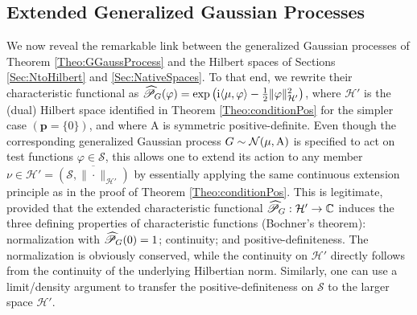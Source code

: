 \documentclass[11pt, english,english]{article}
\newcommand{\C}{ \mathbb{C}}
\newcommand{\R}{ \mathbb{R}}
\def\V#1{{\boldsymbol{#1}}}         %
\def\Spc#1{{\mathcal{#1}}}  %
\def\Op#1{{\mathrm{#1}}}  %
\def\jj{\mathrm{i}}
\def\Prob{\mathscr{P}}
\def\Form{\widehat{\Prob}}
\def\Identity{\mathrm{Id}} %
\renewcommand{\[}{\begin{equation}}
\renewcommand{\]}[1]{\label{eq:#1}\end{equation}}
\def\Prob{\mathscr{P}}
\def\Form{\widehat{\Prob}}
\def\gRand#1{{\uppercase{ #1}}}         %
\begin{document}
\subsection{Extended Generalized Gaussian Processes}
\label{Sec:ExtendedProcesses}
We now reveal the remarkable link between the generalized Gaussian processes of Theorem \ref{Theo:GGaussProcess} and the Hilbert spaces of Sections \ref{Sec:NtoHilbert} and \ref{Sec:NativeSpaces}.
To that end, we rewrite their characteristic functional as
$\Form_{\gRand g}(\varphi)= \exp\left( \jj \langle \mu,\varphi\rangle - \frac{1}{2} \|\varphi\|^2_{\Spc H'} \right)$, where
$\Spc H'$ is the (dual) Hilbert space identified in Theorem \ref{Theo:conditionPos} for the simpler case $(\V p=\{0\})$, and where $\Op A$ is symmetric positive-definite.
Even though the corresponding generalized Gaussian process $\gRand g \sim \Spc N(\mu,\Op A)$ is specified to act on test functions $\varphi \in \Spc S$, this allows one to extend its action to any member $\nu \in \Spc H'=\overline{(\Spc S,\|\cdot\|_{\Spc H'})}$ by essentially applying the same continuous extension principle as in the proof of Theorem \ref{Theo:conditionPos}.
This is legitimate, provided that the extended characteristic functional $\Form_{\gRand g}: \Spc H' \to \C$ induces the three defining properties of characteristic functions (Bochner's theorem): normalization with $\Form_{\gRand g}(0)=1$; continuity; and positive-definiteness.
The normalization is obviously conserved, while the continuity on $\Spc H'$ directly follows from the continuity of the underlying Hilbertian norm.
Similarly, one can use a limit/density argument to transfer the positive-definiteness on $\Spc S$ to the larger space $\Spc H'$.

%
\end{document}
